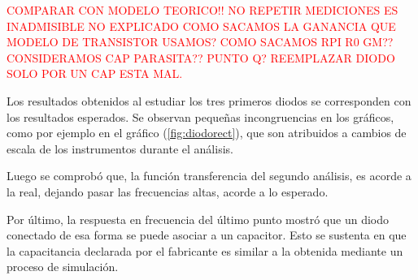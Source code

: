 \documentclass[a4paper]{article}
\begin{document}
\textcolor{red}{COMPARAR CON MODELO TEORICO!!}
\textcolor{red}{NO REPETIR MEDICIONES ES INADMISIBLE}
\textcolor{red}{NO EXPLICADO COMO SACAMOS LA GANANCIA}
\textcolor{red}{QUE MODELO DE TRANSISTOR USAMOS? COMO SACAMOS RPI R0 GM?? CONSIDERAMOS CAP PARASITA?? PUNTO Q?}
\textcolor{red}{REEMPLAZAR DIODO SOLO POR UN CAP ESTA MAL.}

Los resultados obtenidos al estudiar los tres primeros diodos se corresponden con los resultados esperados. Se observan pequeñas incongruencias en los gráficos, como por ejemplo en el gráfico (\ref{fig:diodorect}), que son atribuidos a cambios de escala de los instrumentos durante el análisis.

Luego se comprobó que, la función transferencia del segundo análisis, es acorde a la real, dejando pasar las frecuencias altas, acorde a lo esperado.

Por último, la respuesta en frecuencia del último punto mostró que un diodo conectado de esa forma se puede asociar a un capacitor. Esto se sustenta en que la capacitancia declarada por el fabricante es similar a la obtenida mediante un proceso de simulación.
\end{document}
